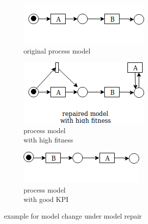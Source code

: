 \documentclass[]{article}
\begin{document}
\begin{figure}[h]
	\centering
	\begin{subfigure}[b]{0.32\textwidth}
		\centering
		\includegraphics[width=\linewidth]{P04_modelchange_a.png}
		\caption{original process model}
		\label{fig:model_a}
	\end{subfigure}
	\hfill
	\begin{subfigure}[b]{0.32\textwidth}
		\centering
		\includegraphics[width=\linewidth]{P05_modelchange_b.png}
		\caption{process model \\ with high fitness}
		\label{fig:model_b}
	\end{subfigure}
	\hfill
	\begin{subfigure}[b]{0.32\textwidth}
		\centering
		\includegraphics[width=01.0\linewidth]{P04_modelchange_c.png}
		\caption{process model \\ with good KPI}
		\label{fig:model_c}
	\end{subfigure}
	
	\caption{example for model change under model repair}
	\label{fig:model_examples}
\end{figure}
\end{document}
